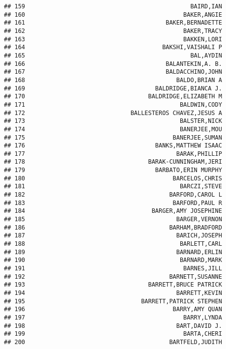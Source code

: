 \documentclass[
]{article}
\begin{document}
\begin{verbatim}
## 159                                               BAIRD,IAN
## 160                                             BAKER,ANGIE
## 161                                        BAKER,BERNADETTE
## 162                                             BAKER,TRACY
## 163                                             BAKKEN,LORI
## 164                                       BAKSHI,VAISHALI P
## 165                                               BAL,AYDIN
## 166                                        BALANTEKIN,A. B.
## 167                                        BALDACCHINO,JOHN
## 168                                           BALDO,BRIAN A
## 169                                     BALDRIDGE,BIANCA J.
## 170                                   BALDRIDGE,ELIZABETH M
## 171                                            BALDWIN,CODY
## 172                              BALLESTEROS CHAVEZ,JESUS A
## 173                                            BALSTER,NICK
## 174                                            BANERJEE,MOU
## 175                                          BANERJEE,SUMAN
## 176                                     BANKS,MATTHEW ISAAC
## 177                                           BARAK,PHILLIP
## 178                                   BARAK-CUNNINGHAM,JERI
## 179                                     BARBATO,ERIN MURPHY
## 180                                          BARCELOS,CHRIS
## 181                                            BARCZI,STEVE
## 182                                         BARFORD,CAROL L
## 183                                          BARFORD,PAUL R
## 184                                    BARGER,AMY JOSEPHINE
## 185                                           BARGER,VERNON
## 186                                         BARHAM,BRADFORD
## 187                                           BARICH,JOSEPH
## 188                                            BARLETT,CARL
## 189                                           BARNARD,ERLIN
## 190                                            BARNARD,MARK
## 191                                             BARNES,JILL
## 192                                         BARNETT,SUSANNE
## 193                                   BARRETT,BRUCE PATRICK
## 194                                           BARRETT,KEVIN
## 195                                 BARRETT,PATRICK STEPHEN
## 196                                          BARRY,AMY QUAN
## 197                                             BARRY,LYNDA
## 198                                           BART,DAVID J.
## 199                                             BARTA,CHERI
## 200                                         BARTFELD,JUDITH

\end{verbatim}
\end{document}
